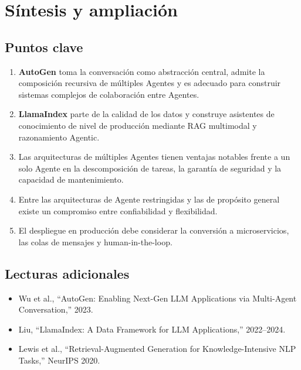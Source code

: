 \section{Síntesis y ampliación}

\subsection{Puntos clave}

\begin{enumerate}
    \item \textbf{AutoGen} toma la conversación como abstracción central, admite la composición recursiva de múltiples Agentes y es adecuado para construir sistemas complejos de colaboración entre Agentes.
    \item \textbf{LlamaIndex} parte de la calidad de los datos y construye asistentes de conocimiento de nivel de producción mediante RAG multimodal y razonamiento Agentic.
    \item Las arquitecturas de múltiples Agentes tienen ventajas notables frente a un solo Agente en la descomposición de tareas, la garantía de seguridad y la capacidad de mantenimiento.
    \item Entre las arquitecturas de Agente restringidas y las de propósito general existe un compromiso entre confiabilidad y flexibilidad.
    \item El despliegue en producción debe considerar la conversión a microservicios, las colas de mensajes y human-in-the-loop.
\end{enumerate}

\subsection{Lecturas adicionales}

\begin{itemize}
    \item Wu et al., ``AutoGen: Enabling Next-Gen LLM Applications via Multi-Agent Conversation,'' 2023.
    \item Liu, ``LlamaIndex: A Data Framework for LLM Applications,'' 2022--2024.
    \item Lewis et al., ``Retrieval-Augmented Generation for Knowledge-Intensive NLP Tasks,'' NeurIPS 2020.
\end{itemize}


